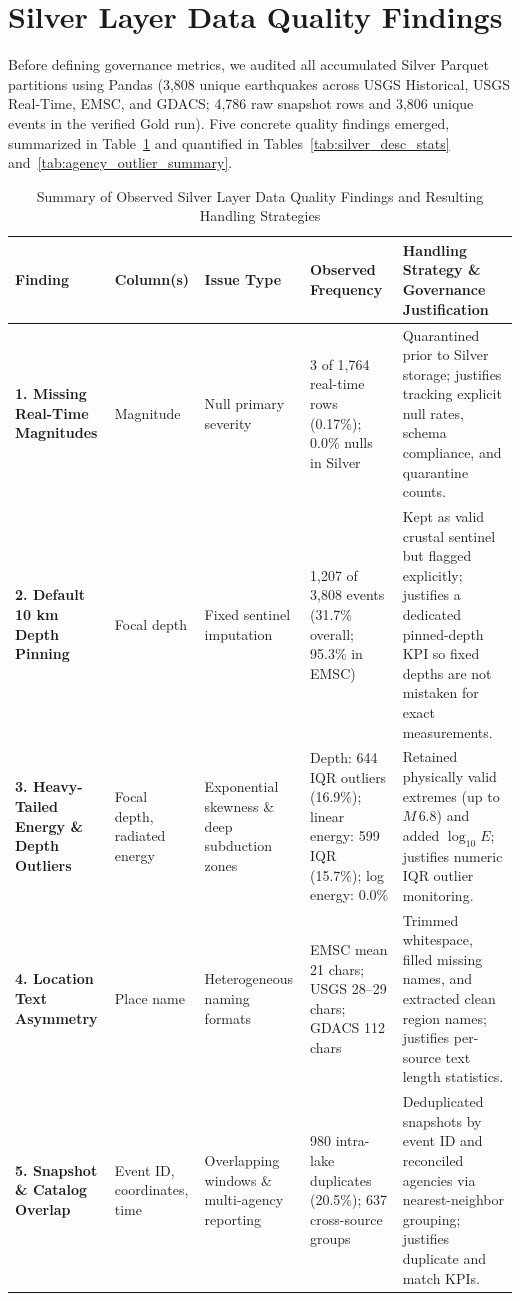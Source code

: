 \section{Silver Layer Data Quality Findings}

Before defining governance metrics, we audited all accumulated Silver Parquet partitions using Pandas (3,808 unique earthquakes across USGS Historical, USGS Real-Time, EMSC, and GDACS; 4,786 raw snapshot rows and 3,806 unique events in the verified Gold run). Five concrete quality findings emerged, summarized in Table~\ref{tab:silver_findings} and quantified in Tables~\ref{tab:silver_desc_stats} and~\ref{tab:agency_outlier_summary}.

\begin{table}[!t]
\centering
\caption{Summary of Observed Silver Layer Data Quality Findings and Resulting Handling Strategies}
\label{tab:silver_findings}
\footnotesize
\renewcommand{\arraystretch}{1.14}
\begin{tabularx}{\textwidth}{p{2.5cm} p{1.9cm} p{2.3cm} p{2.7cm} X}
\toprule
\textbf{Finding} & \textbf{Column(s)} & \textbf{Issue Type} & \textbf{Observed Frequency} & \textbf{Handling Strategy \& Governance Justification} \\
\midrule
\textbf{1. Missing Real-Time Magnitudes} & Magnitude & Null primary severity & 3 of 1,764 real-time rows (0.17\%); 0.0\% nulls in Silver & Quarantined prior to Silver storage; justifies tracking explicit null rates, schema compliance, and quarantine counts. \\
\textbf{2. Default 10 km Depth Pinning} & Focal depth & Fixed sentinel imputation & 1,207 of 3,808 events (31.7\% overall; 95.3\% in EMSC) & Kept as valid crustal sentinel but flagged explicitly; justifies a dedicated pinned-depth KPI so fixed depths are not mistaken for exact measurements. \\
\textbf{3. Heavy-Tailed Energy \& Depth Outliers} & Focal depth, radiated energy & Exponential skewness \& deep subduction zones & Depth: 644 IQR outliers (16.9\%); linear energy: 599 IQR (15.7\%); log energy: 0.0\% & Retained physically valid extremes (up to $M\,6.8$) and added $\log_{10} E$; justifies numeric IQR outlier monitoring. \\
\textbf{4. Location Text Asymmetry} & Place name & Heterogeneous naming formats & EMSC mean 21 chars; USGS 28--29 chars; GDACS 112 chars & Trimmed whitespace, filled missing names, and extracted clean region names; justifies per-source text length statistics. \\
\textbf{5. Snapshot \& Catalog Overlap} & Event ID, coordinates, time & Overlapping windows \& multi-agency reporting & 980 intra-lake duplicates (20.5\%); 637 cross-source groups & Deduplicated snapshots by event ID and reconciled agencies via nearest-neighbor grouping; justifies duplicate and match KPIs. \\
\bottomrule
\end{tabularx}
\end{table}

